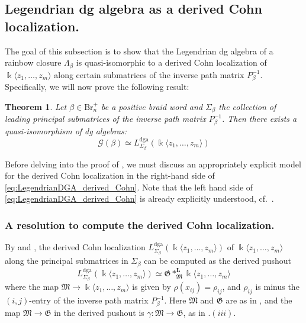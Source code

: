 \documentclass[11pt]{article}
\newtheorem{theorem}{Theorem}[section]
\newcommand{\kk}{\Bbbk}
\newcommand{\La}{\Lambda}
\newcommand{\FM}{\mathfrak M}
\newcommand{\FG}{\mathfrak G}
\newcommand{\lr}{\longrightarrow}
\newcommand{\cG}{\mathcal G}
\begin{document}

\subsection{ Legendrian dg algebra as a derived Cohn localization.}\label{ssec:Legendrian_DGA_derived_Cohn} The goal of this subsection is to show that the Legendrian dg algebra of a rainbow closure $\La_\beta$ is quasi-isomorphic to a derived Cohn localization of $\kk\langle z_1,\ldots,z_m\rangle$ along certain submatrices of the inverse path matrix $P_\beta^{-1}$. Specifically, we will now prove the following result:

\begin{theorem}
\label{prop:derived-model}
Let $\beta\in\mbox{Br}_n^+$ be a positive braid word and $\Sigma_\beta$ the collection of leading principal submatrices of the inverse path matrix $P_\beta^{-1}$. Then there exists a quasi-isomorphism of dg algebras:
\begin{equation}\label{eq:LegendrianDGA_derived_Cohn}
 \cG(\beta)\simeq L^{\mathrm{dga}}_{\Sigma_\beta}(\kk\langle z_1,\ldots,z_m\rangle)   
\end{equation}
\end{theorem}

\noindent Before delving into the proof of , we must discuss an appropriately explicit model for the derived Cohn localization in the right-hand side of \eqref{eq:LegendrianDGA_derived_Cohn}. Note that the left hand side of \eqref{eq:LegendrianDGA_derived_Cohn} is already explicitly understood, cf.~.

\subsubsection{A resolution to compute the derived Cohn localization.}\label{sssec:model_resolution_derived_Cohn} By  and \cite[Theorem~4.36]{BCL}, the derived Cohn localization $L^{\mathrm{dga}}_{\Sigma_\beta}(\kk\langle z_1,\ldots,z_m\rangle)$ of $\kk\langle z_1,\ldots,z_m\rangle$ along the principal submatrices in $\Sigma_\beta$ can be computed as the derived pushout
\begin{equation}\label{eq:derived_pushout}
L^{\mathrm{dga}}_{\Sigma_\beta}(\kk\langle z_1,\ldots,z_m\rangle)\simeq \FG*^{\mathbf L}_{\FM}\kk\langle z_1,\ldots,z_m\rangle
\end{equation}
where the map $\FM\lr\kk\langle z_1,\ldots,z_m\rangle$ is given by $\rho(x_{ij})=\rho_{ij}$, and $\rho_{ij}$ is minus the $(i,j)$-entry of the inverse path matrix $P_{\beta}^{-1}$. Here $\FM$ and $\FG$ are as in , and the map $\FM\lr\FG$ in the derived pushout is $\gamma:\FM\lr\FG$, as in .$(iii)$.\\
\end{document}
